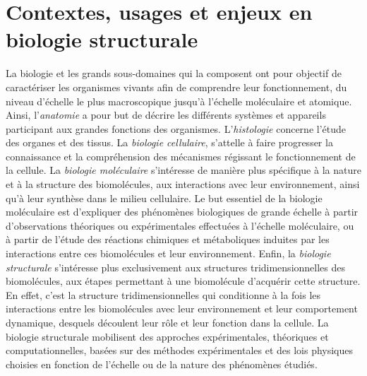 
\chapter[Contextes, usages et enjeux en biologie structurale]{Contextes, usages et enjeux en biologie structurale}
\minitoc
\cleardoublepage






La biologie et les grands sous-domaines qui la composent ont pour objectif de caractériser les organismes vivants afin de comprendre leur fonctionnement, du niveau d'échelle le plus macroscopique jusqu'à l'échelle moléculaire et atomique. Ainsi, l'\emph{anatomie} a pour but de décrire les différents systèmes et appareils participant aux grandes fonctions des organismes. L'\emph{histologie} concerne l'étude des organes et des tissus. La \emph{biologie  cellulaire}, s'attelle à faire progresser la connaissance et la compréhension des mécanismes régissant le fonctionnement de la cellule. La \emph{biologie moléculaire} s'intéresse de manière plus spécifique à la nature et à la structure des biomolécules, aux interactions avec leur environnement, ainsi qu'à leur synthèse dans le milieu cellulaire. Le but essentiel de la biologie moléculaire est d'expliquer des phénomènes biologiques de grande échelle à partir d'observations théoriques ou expérimentales effectuées à l'échelle moléculaire, ou à partir de l'étude des réactions chimiques et métaboliques induites par les interactions entre ces biomolécules et leur environnement. Enfin, la \emph{biologie structurale} s'intéresse plus exclusivement aux structures tridimensionnelles des biomolécules, aux  étapes permettant à une biomolécule d'acquérir cette structure. En effet, c'est la structure tridimensionnelles qui conditionne à la fois les interactions entre les biomolécules avec leur environnement et leur comportement dynamique, desquels découlent leur rôle et leur fonction dans la cellule. La biologie structurale mobilisent des approches expérimentales, théoriques et computationnelles, basées sur des méthodes expérimentales et des lois physiques choisies en fonction de l'échelle ou de la nature des phénomènes étudiés.


